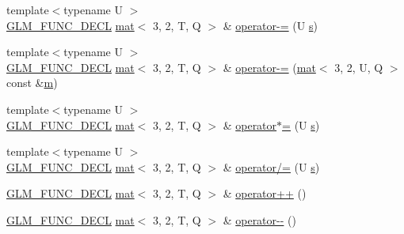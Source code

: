 \begin{DoxyCompactItemize}
\item 
{\footnotesize template$<$typename U $>$ }\\\hyperlink{setup_8hpp_ab2d052de21a70539923e9bcbf6e83a51}{G\+L\+M\+\_\+\+F\+U\+N\+C\+\_\+\+D\+E\+CL} \hyperlink{structglm_1_1mat}{mat}$<$ 3, 2, T, Q $>$ \& \hyperlink{structglm_1_1mat_3_013_00_012_00_01_t_00_01_q_01_4_a0ab9b96cc625abbf3ecec33240d5db7e}{operator-\/=} (U \hyperlink{_s_d_l__opengl_8h_a4af680a6c683f88ed67b76f207f2e6e4}{s})
\item 
{\footnotesize template$<$typename U $>$ }\\\hyperlink{setup_8hpp_ab2d052de21a70539923e9bcbf6e83a51}{G\+L\+M\+\_\+\+F\+U\+N\+C\+\_\+\+D\+E\+CL} \hyperlink{structglm_1_1mat}{mat}$<$ 3, 2, T, Q $>$ \& \hyperlink{structglm_1_1mat_3_013_00_012_00_01_t_00_01_q_01_4_a5f0d9bcf7905c11160d68dbb173b1f19}{operator-\/=} (\hyperlink{structglm_1_1mat}{mat}$<$ 3, 2, U, Q $>$ const \&\hyperlink{_s_d_l__opengl__glext_8h_af593500c283bf1a787a6f947f503a5c2}{m})
\item 
{\footnotesize template$<$typename U $>$ }\\\hyperlink{setup_8hpp_ab2d052de21a70539923e9bcbf6e83a51}{G\+L\+M\+\_\+\+F\+U\+N\+C\+\_\+\+D\+E\+CL} \hyperlink{structglm_1_1mat}{mat}$<$ 3, 2, T, Q $>$ \& \hyperlink{structglm_1_1mat_3_013_00_012_00_01_t_00_01_q_01_4_a10c3599e06deb91b06f2f55fb9b6fe3f}{operator$\ast$=} (U \hyperlink{_s_d_l__opengl_8h_a4af680a6c683f88ed67b76f207f2e6e4}{s})
\item 
{\footnotesize template$<$typename U $>$ }\\\hyperlink{setup_8hpp_ab2d052de21a70539923e9bcbf6e83a51}{G\+L\+M\+\_\+\+F\+U\+N\+C\+\_\+\+D\+E\+CL} \hyperlink{structglm_1_1mat}{mat}$<$ 3, 2, T, Q $>$ \& \hyperlink{structglm_1_1mat_3_013_00_012_00_01_t_00_01_q_01_4_a366134387db31e4ae0b165945530d885}{operator/=} (U \hyperlink{_s_d_l__opengl_8h_a4af680a6c683f88ed67b76f207f2e6e4}{s})
\item 
\hyperlink{setup_8hpp_ab2d052de21a70539923e9bcbf6e83a51}{G\+L\+M\+\_\+\+F\+U\+N\+C\+\_\+\+D\+E\+CL} \hyperlink{structglm_1_1mat}{mat}$<$ 3, 2, T, Q $>$ \& \hyperlink{structglm_1_1mat_3_013_00_012_00_01_t_00_01_q_01_4_ad68d45e51b9606b49706ac69d2a68609}{operator++} ()
\item 
\hyperlink{setup_8hpp_ab2d052de21a70539923e9bcbf6e83a51}{G\+L\+M\+\_\+\+F\+U\+N\+C\+\_\+\+D\+E\+CL} \hyperlink{structglm_1_1mat}{mat}$<$ 3, 2, T, Q $>$ \& \hyperlink{structglm_1_1mat_3_013_00_012_00_01_t_00_01_q_01_4_a0968f00c3de947faa30c496ff103a0ec}{operator-\/-\/} ()
\item 

\end{DoxyCompactItemize}
